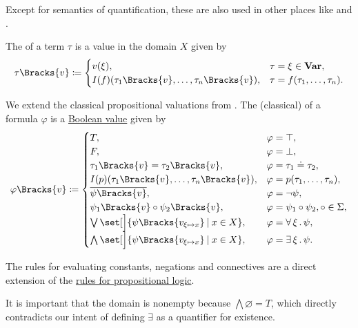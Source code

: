 \begin{definition}
\begin{thmenum}
    Except for semantics of quantification, these are also used in other places like  and .

     The  of a term \( \tau \) is a value in the domain \( X \) given by
    \begin{equation}\label{eq:def:first_order_valuation/term_valuation}
      \tau\Bracks{v} \coloneqq \begin{cases}
        v(\xi),                                           &\tau = \xi \in \boldop{Var}, \\
        I(f)(\tau_1\Bracks{v}, \ldots, \tau_n\Bracks{v}), &\tau = f(\tau_1, \ldots, \tau_n).
      \end{cases}
    \end{equation}

     We extend the classical propositional valuations from . The (classical)  of a formula \( \varphi \) is a \hyperref[def:boolean_value]{Boolean value} given by
    \begin{equation}\label{eq:def:first_order_valuation/formula_valuation}
      \varphi\Bracks{v} \coloneqq \begin{cases}
        T,                                                              &\varphi = \top, \\
        F,                                                              &\varphi = \bot, \\
        \tau_1\Bracks{v} = \tau_2\Bracks{v},                            &\varphi = \tau_1 \doteq \tau_2, \\
        I(p)(\tau_1\Bracks{v}, \ldots, \tau_n\Bracks{v}),               &\varphi = p(\tau_1, \ldots, \tau_n), \\
        \overline{\psi\Bracks{v}},                                      &\varphi = \neg \psi, \\
        \psi_1\Bracks{v} \bincirc \psi_2\Bracks{v},                     &\varphi = \psi_1 \bincirc \psi_2, \bincirc \in \Sigma, \\
        \bigvee\set[\Big]{ \psi\Bracks{v_{\xi \mapsto x}} \given x \in X },   &\varphi = \qforall \xi \psi, \\
        \bigwedge\set[\Big]{ \psi\Bracks{v_{\xi \mapsto x}} \given x \in X }, &\varphi = \qexists \xi \psi.
      \end{cases}
    \end{equation}

    The rules for evaluating constants, negations and connectives are a direct extension of the \hyperref[def:propositional_valuation/formula_valuation]{rules for propositional logic}.

    It is important that the domain is nonempty because \( \bigwedge\varnothing = T \), which directly contradicts our intent of defining \( \exists \) as a quantifier for existence.
  \end{thmenum}
\end{definition}

